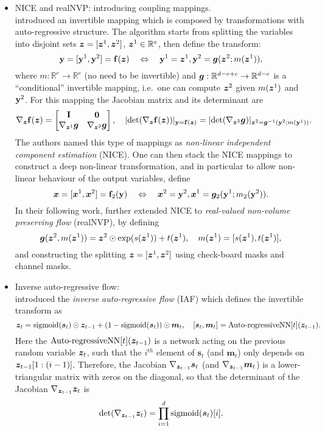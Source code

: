 \begin{itemize}
\item NICE and realNVP: introducing coupling mappings. \\
\cite{dinh:nice2014} introduced an invertible mapping which is composed by transformations with auto-regressive structure. The algorithm starts from splitting the variables into disjoint sets $\bm{z} = [\bm{z}^1, \bm{z}^2]$, $\bm{z}^1 \in \mathbb{R}^e$, then define the transform:
$$ \mathbf{y} = [\mathbf{y}^1, \mathbf{y}^2] = \mathbf{f}(\bm{z}) \quad \Leftrightarrow \quad \mathbf{y}^1 = \bm{z}^1, \mathbf{y}^2 = \bm{g}(\bm{z}^2; m(\bm{z}^1)),$$
where $m: \mathbb{R}^{e} \rightarrow \mathbb{R}^c$ (no need to be invertible) and $\bm{g}: \mathbb{R}^{d - e + c} \rightarrow \mathbb{R}^{d - e}$ is a ``conditional'' invertible mapping, i.e.~one can compute $\bm{z}^2$ given $m(\bm{z}^1)$ and $\mathbf{y}^2$. For this mapping the Jacobian matrix and its determinant are
\begin{equation*}
\nabla_{\bm{z}} \mathbf{f}(\bm{z}) = \begin{bmatrix}
    \mathbf{I}       & \bm{0} \\
    \nabla_{\bm{z}^1} \bm{g}  & \nabla_{\bm{z}^2} \bm{g}
\end{bmatrix}, \quad 
|\text{det}( \nabla_{\bm{z}} \mathbf{f}(\bm{z})) |_{\mathbf{y} = \mathbf{f}(\bm{z})} = |\text{det} (\nabla_{\bm{z}^2} \bm{g} ) |_{\bm{z}^2 = \bm{g}^{-1}(\mathbf{y}^2; m(\mathbf{y}^1))} .
\end{equation*}
The authors named this type of mappings as \emph{non-linear independent component estimation} (NICE).
One can then stack the NICE mappings to construct a deep non-linear transformation, and in particular to allow non-linear behaviour of the output variables, define
$$ \bm{x} = [\bm{x}^1, \bm{x}^2] = \mathbf{f}_2 (\mathbf{y}) \quad \Leftrightarrow \quad \bm{x}^2 = \mathbf{y}^2, \bm{x}^1 = \bm{g}_2(\mathbf{y}^1; m_2(\mathbf{y}^2)).$$
In their following work, \cite{dinh:realnvp2017} further extended NICE to \emph{real-valued non-volume preserving flow} (realNVP), by defining
$$\bm{g}(\bm{z}^2, m(\bm{z}^1)) = \bm{z}^2 \odot \exp( s(\bm{z}^1) ) + t(\bm{z}^1), \quad m(\bm{z}^1) = [s(\bm{z}^1), t(\bm{z}^1)],$$
and constructing the splitting $\bm{z} = [\bm{z}^1, \bm{z}^2]$ using check-board masks and channel masks.

\item Inverse auto-regressive flow: \\
\cite{kingma:iaf2016} introduced the \emph{inverse auto-regressive flow} (IAF) which defines the invertible transform as
$$ \bm{z}_t = \text{sigmoid}(\bm{s}_t) \odot \bm{z}_{t-1} + (1 - \text{sigmoid}(\bm{s}_t)) \odot \bm{m}_t, \quad [\bm{s}_t, \bm{m}_t] = \text{Auto-regressiveNN}[t](\bm{z}_{t-1}). $$
Here the $\text{Auto-regressiveNN}[t](\bm{z}_{t-1})$ is a network acting on the previous random variable $\bm{z}_t$, such that the $i^{th}$ element of $\bm{s}_t$ (and $\bm{m}_t$) only depends on $\bm{z}_{t-1}[1:(i-1)]$. Therefore, the Jacobian $\nabla_{\bm{z}_{t-1}} \bm{s}_t$ (and $\nabla_{\bm{z}_{t-1}} \bm{m}_t$) is a lower-triangular matrix with zeros on the diagonal, so that the determinant of the Jacobian $\nabla_{\bm{z}_{t-1}} \bm{z}_t$ is 
$$\text{det}(\nabla_{\bm{z}_{t-1}} \bm{z}_t) = \prod_{i=1}^d \text{sigmoid}(\bm{s}_t)[i] .$$
\end{itemize}

